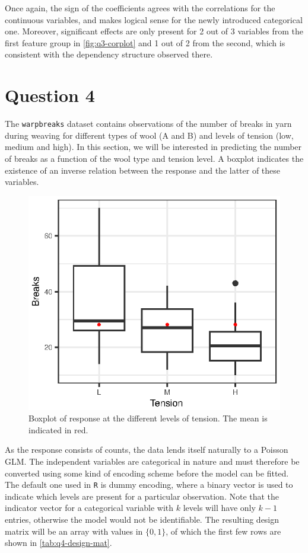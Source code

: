 \documentclass[titlepage]{article}
\begin{document}
Once again, the sign of the coefficients agrees with the correlations for the continuous variables, and makes logical sense for the newly introduced categorical one. Moreover, significant effects are only present for 2 out of 3 variables from the first feature group in \cref{fig:q3-corplot} and 1 out of 2 from the second, which is consistent with the dependency structure observed there.

\section*{Question 4}

The \texttt{warpbreaks} dataset contains observations of the number of breaks in yarn during weaving for different types of wool (A and B) and levels of tension (low, medium and high). In this section, we will be interested in predicting the number of breaks as a function of the wool type and tension level. A boxplot indicates the existence of an inverse relation between the response and the latter of these variables.

\begin{figure}[!htb]
  \centering
  \label{fig:q4-boxplot}
  \includegraphics{q4-boxplot}
  \caption{Boxplot of response at the different levels of tension. The mean is indicated in red.}
\end{figure}

As the response consists of counts, the data lends itself naturally to a Poisson GLM. The independent variables are categorical in nature and must therefore be converted using some kind of encoding scheme before the model can be fitted. The default one used in \texttt{R} is dummy encoding, where a binary vector is used to indicate which levels are present for a particular observation. Note that the indicator vector for a categorical variable with $k$ levels will have only $k - 1$ entries, otherwise the model would not be identifiable. The resulting design matrix will be an array with values in $\{0, 1 \}$, of which the first few rows are shown in \cref{tab:q4-design-mat}.
\end{document}
